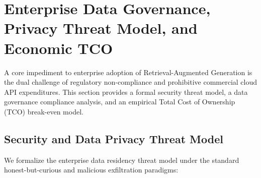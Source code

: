 \section{Enterprise Data Governance, Privacy Threat Model, and Economic TCO}
\label{sec:enterprise_governance}

A core impediment to enterprise adoption of Retrieval-Augmented Generation is the dual challenge of regulatory non-compliance and prohibitive commercial cloud API expenditures. This section provides a formal security threat model, a data governance compliance analysis, and an empirical Total Cost of Ownership (TCO) break-even model.

\subsection{Security and Data Privacy Threat Model}
We formalize the enterprise data residency threat model under the standard honest-but-curious and malicious exfiltration paradigms:

